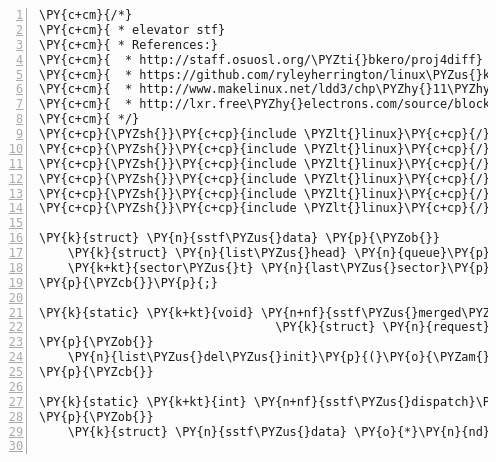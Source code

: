 \begin{Verbatim}[commandchars=\\\{\},numbers=left,firstnumber=1,stepnumber=1]
\PY{c+cm}{/*}
\PY{c+cm}{ * elevator stf}
\PY{c+cm}{ * References:}
\PY{c+cm}{ 	* http://staff.osuosl.org/\PYZti{}bkero/proj4diff}
\PY{c+cm}{ 	* https://github.com/ryleyherrington/linux\PYZus{}kernel\PYZus{}411/blob/master/sstf\PYZhy{}io/sstf\PYZhy{}iosched.c}
\PY{c+cm}{ 	* http://www.makelinux.net/ldd3/chp\PYZhy{}11\PYZhy{}sect\PYZhy{}5}
\PY{c+cm}{ 	* http://lxr.free\PYZhy{}electrons.com/source/block/elevator.c\PYZsh{}L351}
\PY{c+cm}{ */}
\PY{c+cp}{\PYZsh{}}\PY{c+cp}{include \PYZlt{}linux}\PY{c+cp}{/}\PY{c+cp}{blkdev.h\PYZgt{}}
\PY{c+cp}{\PYZsh{}}\PY{c+cp}{include \PYZlt{}linux}\PY{c+cp}{/}\PY{c+cp}{elevator.h\PYZgt{}}
\PY{c+cp}{\PYZsh{}}\PY{c+cp}{include \PYZlt{}linux}\PY{c+cp}{/}\PY{c+cp}{bio.h\PYZgt{}}
\PY{c+cp}{\PYZsh{}}\PY{c+cp}{include \PYZlt{}linux}\PY{c+cp}{/}\PY{c+cp}{module.h\PYZgt{}}
\PY{c+cp}{\PYZsh{}}\PY{c+cp}{include \PYZlt{}linux}\PY{c+cp}{/}\PY{c+cp}{slab.h\PYZgt{}}
\PY{c+cp}{\PYZsh{}}\PY{c+cp}{include \PYZlt{}linux}\PY{c+cp}{/}\PY{c+cp}{init.h\PYZgt{}}

\PY{k}{struct} \PY{n}{sstf\PYZus{}data} \PY{p}{\PYZob{}}
	\PY{k}{struct} \PY{n}{list\PYZus{}head} \PY{n}{queue}\PY{p}{;}
	\PY{k+kt}{sector\PYZus{}t} \PY{n}{last\PYZus{}sector}\PY{p}{;}
\PY{p}{\PYZcb{}}\PY{p}{;}

\PY{k}{static} \PY{k+kt}{void} \PY{n+nf}{sstf\PYZus{}merged\PYZus{}requests}\PY{p}{(}\PY{k}{struct} \PY{n}{request\PYZus{}queue} \PY{o}{*}\PY{n}{q}\PY{p}{,} \PY{k}{struct} \PY{n}{request} \PY{o}{*}\PY{n}{rq}\PY{p}{,}
								 \PY{k}{struct} \PY{n}{request} \PY{o}{*}\PY{n}{next}\PY{p}{)}
\PY{p}{\PYZob{}}
	\PY{n}{list\PYZus{}del\PYZus{}init}\PY{p}{(}\PY{o}{\PYZam{}}\PY{n}{next}\PY{o}{\PYZhy{}}\PY{o}{\PYZgt{}}\PY{n}{queuelist}\PY{p}{)}\PY{p}{;}
\PY{p}{\PYZcb{}}

\PY{k}{static} \PY{k+kt}{int} \PY{n+nf}{sstf\PYZus{}dispatch}\PY{p}{(}\PY{k}{struct} \PY{n}{request\PYZus{}queue} \PY{o}{*}\PY{n}{q}\PY{p}{,} \PY{k+kt}{int} \PY{n}{force}\PY{p}{)}
\PY{p}{\PYZob{}}
	\PY{k}{struct} \PY{n}{sstf\PYZus{}data} \PY{o}{*}\PY{n}{nd} \PY{o}{=} \PY{n}{q}\PY{o}{\PYZhy{}}\PY{o}{\PYZgt{}}\PY{n}{elevator}\PY{o}{\PYZhy{}}\PY{o}{\PYZgt{}}\PY{n}{elevator\PYZus{}data}\PY{p}{;}


\end{Verbatim}
